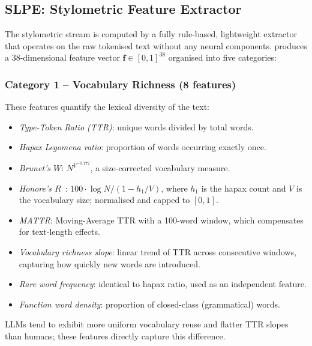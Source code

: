 \subsection{SLPE: Stylometric Feature Extractor}

The stylometric stream is computed by a fully rule-based, lightweight extractor that operates on the raw tokenised text without any neural components. \slpe produces a 38-dimensional feature vector $\mathbf{f} \in [0,1]^{38}$ organised into five categories:

\subsubsection{Category 1 -- Vocabulary Richness (8 features)}
These features quantify the lexical diversity of the text:
\begin{itemize}
  \item \textit{Type-Token Ratio (TTR)}: unique words divided by total words.
  \item \textit{Hapax Legomena ratio}: proportion of words occurring exactly once.
  \item \textit{Brunet's $W$}: $N^{V^{-0.172}}$, a size-corrected vocabulary measure.
  \item \textit{Honore's $R$}~\cite{honore:1979}: $100 \cdot \log N / (1 - h_1/V)$, where $h_1$ is the hapax count and $V$ is the vocabulary size; normalised and capped to $[0,1]$.
  \item \textit{MATTR}: Moving-Average TTR with a 100-word window, which compensates for text-length effects.
  \item \textit{Vocabulary richness slope}: linear trend of TTR across consecutive windows, capturing how quickly new words are introduced.
  \item \textit{Rare word frequency}: identical to hapax ratio, used as an independent feature.
  \item \textit{Function word density}: proportion of closed-class (grammatical) words.
\end{itemize}

LLMs tend to exhibit more uniform vocabulary reuse and flatter TTR slopes than humans; these features directly capture this difference.

